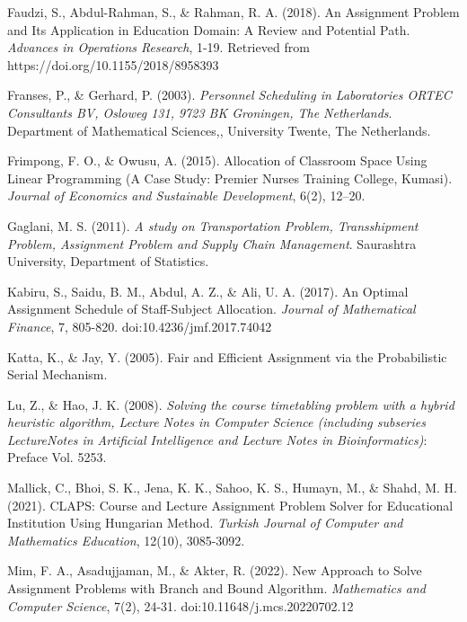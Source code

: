 \documentclass[11pt]{report}
\begin{document}
\begin{description}
		\item Faudzi, S., Abdul-Rahman, S., \& Rahman, R. A. (2018). An Assignment Problem and Its
		Application in Education Domain: A Review and Potential Path. \emph{Advances in Operations
		Research}, 1-19. Retrieved from https://doi.org/10.1155/2018/8958393
		
		\item Franses, P., \& Gerhard, P. (2003). \emph{Personnel Scheduling in Laboratories ORTEC Consultants BV,	Osloweg 131, 9723 BK Groningen, The Netherlands}. Department of Mathematical
		Sciences,, University Twente, The Netherlands.
		
		\item Frimpong, F. O., \& Owusu, A. (2015). Allocation of Classroom Space Using Linear Programming
		(A Case Study: Premier Nurses Training College, Kumasi). \emph{Journal of Economics and
		Sustainable Development}, 6(2), 12–20.
	
		\item Gaglani, M. S. (2011). \emph{A study on Transportation Problem, Transshipment Problem, Assignment Problem and Supply Chain Management}. Saurashtra University, Department of Statistics.
		
		\item Kabiru, S., Saidu, B. M., Abdul, A. Z., \& Ali, U. A. (2017). An Optimal Assignment Schedule of
		Staff-Subject Allocation. \emph{Journal of Mathematical Finance}, 7, 805-820. doi:10.4236/jmf.2017.74042
		
		\item Katta, K., \& Jay, Y. (2005). Fair and Efficient Assignment via the Probabilistic Serial Mechanism.
		
		\item Lu, Z., \& Hao, J. K. (2008). \emph{Solving the course timetabling problem with a hybrid heuristic
		algorithm, Lecture Notes in Computer Science (including subseries LectureNotes in Artificial Intelligence and Lecture Notes in Bioinformatics)}: Preface Vol. 5253.
		
		\item Mallick, C., Bhoi, S. K., Jena, K. K., Sahoo, K. S., Humayn, M., \& Shahd, M. H. (2021). CLAPS:
		Course and Lecture Assignment Problem Solver for Educational Institution Using Hungarian Method. \emph{Turkish Journal of Computer and Mathematics Education}, 12(10), 3085-3092.
		
		\item Mim, F. A., Asadujjaman, M., \& Akter, R. (2022). New Approach to Solve Assignment Problems with Branch and Bound Algorithm. \emph{Mathematics and Computer Science}, 7(2), 24-31. doi:10.11648/j.mcs.20220702.12
		

\end{description}
\end{document}
